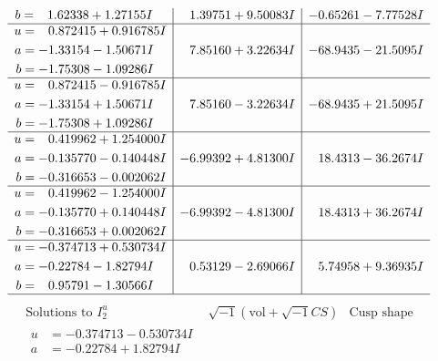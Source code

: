 \documentclass[1p]{elsarticle_modified}
\theoremstyle{definition}
\newcommand{\I}{\sqrt{-1}}
\begin{document}
$$\begin{array}{c|c|c}
\begin{aligned}
b &= \phantom{-}1.62338 + 1.27155 I\end{aligned}
 & \phantom{-}1.39751 + 9.50083 I & -0.65261 - 7.77528 I \\ \hline\begin{aligned}
u &= \phantom{-}0.872415 + 0.916785 I \\
a &= -1.33154 - 1.50671 I \\
b &= -1.75308 - 1.09286 I\end{aligned}
 & \phantom{-}7.85160 + 3.22634 I & -68.9435 - 21.5095 I \\ \hline\begin{aligned}
u &= \phantom{-}0.872415 - 0.916785 I \\
a &= -1.33154 + 1.50671 I \\
b &= -1.75308 + 1.09286 I\end{aligned}
 & \phantom{-}7.85160 - 3.22634 I & -68.9435 + 21.5095 I \\ \hline\begin{aligned}
u &= \phantom{-}0.419962 + 1.254000 I \\
a &= -0.135770 - 0.140448 I \\
b &= -0.316653 - 0.002062 I\end{aligned}
 & -6.99392 + 4.81300 I & \phantom{-}18.4313 - 36.2674 I \\ \hline\begin{aligned}
u &= \phantom{-}0.419962 - 1.254000 I \\
a &= -0.135770 + 0.140448 I \\
b &= -0.316653 + 0.002062 I\end{aligned}
 & -6.99392 - 4.81300 I & \phantom{-}18.4313 + 36.2674 I \\ \hline\begin{aligned}
u &= -0.374713 + 0.530734 I \\
a &= -0.22784 - 1.82794 I \\
b &= \phantom{-}0.95791 - 1.30566 I\end{aligned}
 & \phantom{-}0.53129 - 2.69066 I & \phantom{-}5.74958 + 9.36935 I\\
 \hline 
 \end{array}$$\newpage$$\begin{array}{c|c|c}  
\text{Solutions to }I^u_{2}& \I (\text{vol} + \sqrt{-1}CS) & \text{Cusp shape}\\
 \hline 
\begin{aligned}
u &= -0.374713 - 0.530734 I \\
a &= -0.22784 + 1.82794 I \\

\end{aligned}
\end{array}$$
\end{document}
